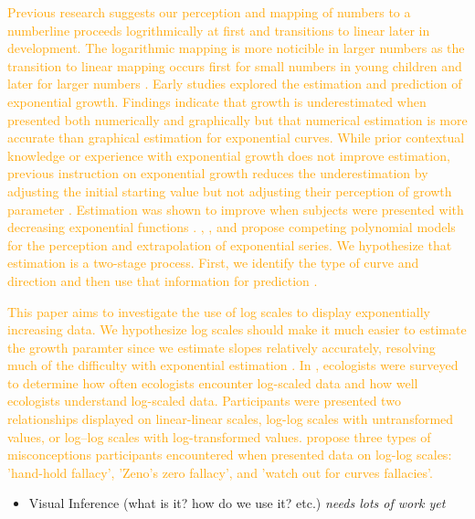 \documentclass[]{interact}
\theoremstyle{plain}%
\theoremstyle{definition}
\theoremstyle{remark}
\def\tightlist{}
\begin{document}
\textcolor{Orange}{
Previous research suggests our perception and mapping of numbers to a numberline proceeds logrithmically at first and transitions to linear later in development. 
The logarithmic mapping is more noticible in larger numbers as the transition to linear mapping occurs first for small numbers in young children and later for larger numbers \citep{varshney_why_2013, siegler_numerical_2017, dehaeneLogLinearDistinct2008}.
Early studies explored the estimation and prediction of exponential growth. 
Findings indicate that growth is underestimated when presented both numerically and graphically but that numerical estimation is more accurate than graphical estimation for exponential curves. 
While prior contextual knowledge or experience with exponential growth does not improve estimation, previous instruction on exponential growth reduces the underestimation by adjusting the initial starting value but not adjusting their perception of growth parameter
\citep{wagenaar_misperception_1975, jones_polynomial_1977}.
Estimation was shown to improve when subjects were presented with decreasing exponential functions \citep{timmers_inverse_1977}.
\cite{jones_polynomial_1977}, \cite{wagenaar_extrapolation_1978}, and \cite{jones_generalized_1979} propose competing polynomial models for the perception and extrapolation of exponential series.
We hypothesize that estimation is a two-stage process. First, we identify the type of curve and direction and then use that information for prediction \citep{best_perception_2007}.
}

\textcolor{Orange}{
This paper aims to investigate the use of log scales to display exponentially increasing data. We hypothesize log scales should make it much easier to estimate the growth paramter since we estimate slopes relatively accurately, resolving much of the difficulty with exponential estimation \citep{mosteller_eye_1981}.
In \cite{menge_logarithmic_2018}, ecologists were surveyed to determine how often ecologists encounter log-scaled data and how well ecologists understand log-scaled data. 
Participants were presented two relationships displayed on linear-linear scales, log-log scales with untransformed values, or log–log scales with log-transformed values. 
\cite{menge_logarithmic_2018} propose three types of misconceptions participants encountered when presented data on log-log scales: 'hand-hold fallacy', 'Zeno's zero fallacy', and 'watch out for curves fallacies'. 
}

\begin{itemize}
\tightlist
\item
  Visual Inference (what is it? how do we use it? etc.) \emph{needs lots
  of work yet}
\end{itemize}
\end{document}
